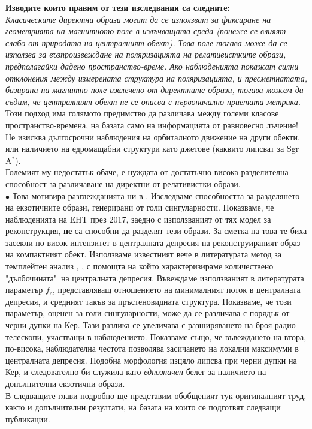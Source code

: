 \textbf{Изводите които правим от тези изследвания са следните:}\\
\emph{Класическите директни образи могат да се използват за фиксиране на геометрията на магнитното поле в излъчващата среда (понеже се влияят слабо от природата на централният обект). Това поле тогава може да се използва за възпроизвеждане на поляризацията на релативистките образи, предполагайки дадено пространство-време. Ако наблюденията покажат силни отклонения между измерената структура на поляризацията, и пресметнатата, базирана на магнитно поле извлечено от директните образи, тогава можем да съдим, че централният обект не се описва с първоначално приетата метрика.}\\\newline
Този подход има голямото предимство да различава между големи класове пространство-времена, на базата само на информацията от равновесно лъчение! Не изисква дългосрочни наблюдения на орбиталното движение на други обекти, или наличието на едромащабни структури като джетове (каквито липсват за Sgr A$^*$).\\

\noindent Големият му недостатък обаче, е нуждата от достатъчно висока разделителна способност за различаване на директни от релативистки образи. \\\newline
$\bullet$ Това мотивира разглежданията ни в \cite{Deliyski2024}. Изследваме способността за разделянето на екзотичните образи, генерирани от голи сингуларности. Показваме, че наблюденията на EHT през 2017, заедно с използваният от тях модел за реконструкция, \textbf{не} са способни да разделят тези образи. За сметка на това те биха засекли по-висок интензитет в централната депресия на реконструираният образ на компактният обект. Използваме известният вече в литературата метод за темплейтен анализ \cite{Eichhorn2022}, \cite{Tiede2022}, с помощта на който характеризираме количествено "дълбочината"$\,$ на централната депресия. Въвеждаме използваният в литературата параметър $f_c$, представляващ отношението на минималният поток в централната депресия, и средният такъв за пръстеновидната структура. Показваме, че този параметър, оценен за голи сингуларности, може да се различава с порядък от черни дупки на Кер. Тази разлика се увеличава с разширяването на броя радио телескопи, участващи в наблюдението. Показваме също, че въвеждането на втора, по-висока, наблюдателна честота позволява засичането на локални максимуми в централната депресия. Подобна морфология изцяло липсва при черни дупки на Кер, и следователно би служила като \emph{еднозначен} белег за наличието на допълнителни екзотични образи.\\\newline
В следващите глави подробно ще представим обобщеният тук оригиналният труд, както и допълнителни резултати, на базата на които се подготвят следващи публикации. 
\lfoot{}